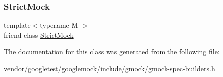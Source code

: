 \subsubsection{\texorpdfstring{Strict\+Mock}{StrictMock}}
{\footnotesize\ttfamily template$<$typename M $>$ \\
friend class \hyperlink{classtesting_1_1_strict_mock}{Strict\+Mock}\hspace{0.3cm}{\ttfamily [friend]}}



The documentation for this class was generated from the following file\+:\begin{DoxyCompactItemize}
\item 
vendor/googletest/googlemock/include/gmock/\hyperlink{gmock-spec-builders_8h}{gmock-\/spec-\/builders.\+h}\end{DoxyCompactItemize}
